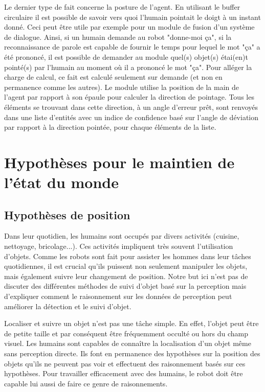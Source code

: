 \documentclass[a4paper,11pt,twoside]{StyleThese}
\begin{document}
Le dernier type de fait concerne la posture de l'agent. En utilisant le buffer circulaire il est possible de savoir vers quoi l'humain pointait le doigt à un instant donné. Ceci peut être utile par exemple pour un module de fusion d'un système de dialogue. Ainsi, si un humain demande au robot "donne-moi ça", si la reconnaissance de parole est capable de fournir le temps pour lequel le mot "ça" a été prononcé, il est possible de demander au module quel(s) objet(s) étai(en)t pointé(s) par l'humain au moment où il a prononcé le mot "ça". Pour alléger la charge de calcul, ce fait est calculé seulement sur demande (et non en permanence comme les autres). Le module utilise la position de la main de l'agent par rapport à son épaule pour calculer la direction de pointage. Tous les éléments se trouvant dans cette direction, à un angle d'erreur prêt, sont renvoyés dans une liste d'entités avec un indice de confidence basé sur l'angle de déviation par rapport à la direction pointée, pour chaque éléments de la liste.




\section{Hypothèses pour le maintien de l'état du monde}
\label{sec:hypo}
\subsection{Hypothèses de position}


Dans leur quotidien, les humains sont occupés par divers activités (cuisine, nettoyage, bricolage...). Ces activités impliquent très souvent l'utilisation d'objets. Comme les robots sont fait pour assister les hommes dans leur tâches quotidiennes, il est crucial qu'ils puissent non seulement manipuler les objets, mais également suivre leur changement de position. Notre but ici n'est pas de discuter des différentes méthodes de suivi d'objet basé sur la perception mais d'expliquer comment le raisonnement sur les données de perception peut améliorer la détection et le suivi d'objet.

Localiser et suivre un objet n'est pas une tâche simple. En effet, l'objet peut être de petite taille et par conséquent être fréquemment occulté ou hors du champ visuel.
Les humains sont capables de connaître la localisation d'un objet même sans perception directe. Ils font en permanence des hypothèses sur la position des objets qu'ils ne peuvent pas voir et effectuent des raisonnement basés sur ces hypothèses. Pour travailler efficacement avec des humains, le robot doit être capable lui aussi de faire ce genre de raisonnements.
\end{document}
